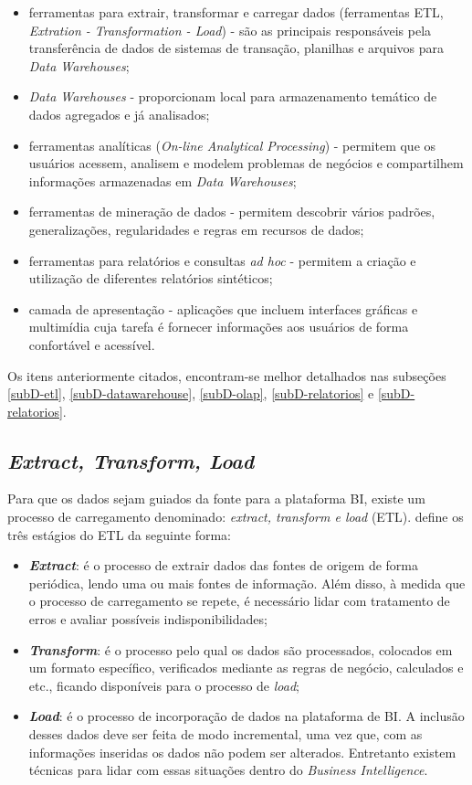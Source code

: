 \begin{itemize}
     \item ferramentas para extrair, transformar e carregar dados (ferramentas ETL, \textit{Extration - Transformation - Load}) - são as principais responsáveis pela transferência de dados de sistemas de transação, planilhas e arquivos para \textit{Data Warehouses};
     \item \textit{Data Warehouses} - proporcionam local para armazenamento temático de dados agregados e já analisados;
     \item ferramentas analíticas (\textit{On-line Analytical Processing}) - permitem que os usuários acessem, analisem e modelem problemas de negócios e compartilhem informações armazenadas em \textit{Data Warehouses};
     \item ferramentas de mineração de dados - permitem descobrir vários padrões, generalizações, regularidades e regras em recursos de dados;
     \item ferramentas para relatórios e consultas \textit{ad hoc} - permitem a criação e utilização de diferentes relatórios sintéticos;
     \item camada de apresentação - aplicações que incluem interfaces gráficas e multimídia cuja tarefa é fornecer informações aos usuários de forma confortável e acessível.
\end{itemize}

Os itens anteriormente citados, encontram-se melhor detalhados nas subseções \autoref{subD-etl}, \autoref{subD-datawarehouse}, \autoref{subD-olap}, \autoref{subD-relatorios} e \autoref{subD-relatorios}.

\subsection{\textit{Extract, Transform, Load}} \label{subD-etl}

Para que os dados sejam guiados da fonte para a plataforma BI, existe um processo de carregamento denominado: \textit{extract, transform e load} (ETL).  define os três estágios do ETL da seguinte forma:
\begin{itemize}
    \item \textbf{\textit{Extract}}: é o processo de extrair dados das fontes de origem de forma periódica, lendo uma ou mais fontes de informação. Além disso, à medida que o processo de carregamento se repete, é necessário lidar com tratamento de erros e avaliar possíveis indisponibilidades;
    \item \textbf{\textit{Transform}}: é o processo pelo qual os dados são processados, colocados em um formato específico, verificados mediante as regras de negócio, calculados e etc., ficando disponíveis para o processo de \textit{load};
    \item \textbf{\textit{Load}}: é o processo de incorporação de dados na plataforma de BI. A inclusão desses dados deve ser feita de modo incremental, uma vez que, com as informações inseridas os dados não podem ser alterados. Entretanto existem técnicas para lidar com essas situações dentro do \textit{Business Intelligence}.
\end{itemize}
